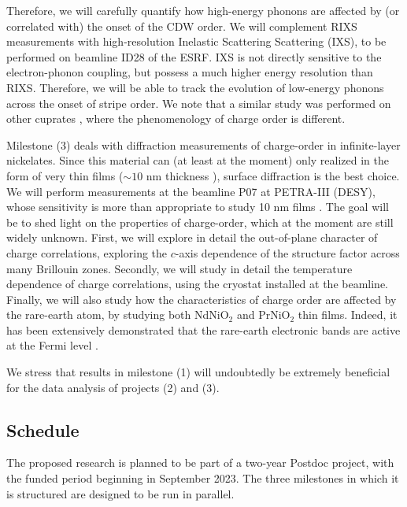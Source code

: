 \documentclass[a4paper, 12pt]{article}
\begin{document}
%
Therefore, we will carefully quantify how high-energy phonons are affected by (or correlated with) the onset of the CDW order.
We will complement RIXS measurements with high-resolution Inelastic Scattering Scattering (IXS), to be performed on beamline ID28 of the ESRF. IXS is not directly sensitive to the electron-phonon coupling, but possess a much higher energy resolution than RIXS. Therefore, we will be able to track the evolution of low-energy phonons across the onset of stripe order. We note that a similar study was performed on other cuprates \cite{le2014inelastic}, where the phenomenology of charge order is different.


Milestone (3) deals with diffraction measurements of charge-order in infinite-layer nickelates. Since this material can (at least at the moment) only realized in the form of very thin films ($\sim10\!$ nm thickness \cite{li2019superconductivity, krieger2022charge}), surface diffraction is the best choice. We will perform measurements at the beamline P07 at PETRA-III (DESY), whose sensitivity is more than appropriate to study 10 nm films \cite{albertin2020surface}. The goal will be to shed light on the properties of charge-order, which at the moment are still widely unknown. First, we will explore in detail the out-of-plane character of charge correlations, exploring the $c$-axis dependence of the structure factor across many Brillouin zones. Secondly, we will study in detail the temperature dependence of charge correlations, using the cryostat installed at the beamline.
Finally, we will also study how the characteristics of charge order are affected by the rare-earth atom, by studying both NdNiO$_2$ and PrNiO$_2$ thin films. Indeed, it has been extensively demonstrated that the rare-earth electronic bands are active at the Fermi level \cite{hepting2020electronic, been2021electronic}.


We stress that results in milestone (1) will undoubtedly be extremely beneficial for the data analysis of projects (2) and (3). 


\subsection{Schedule}
The proposed research is planned to be part of a two-year Postdoc project, with the funded period beginning in September 2023. The three milestones in which it is structured are designed to be run in parallel.
\end{document}
